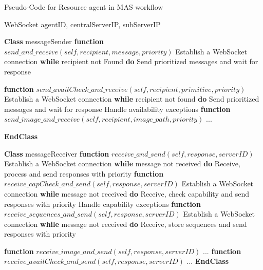 \begin{algorithm}
    \caption{Pseudo-Code for Resource agent in MAS workflow}
    \label{alg:RAPseudoCode}
    \begin{algorithmic}[1]
     WebSocket
     agentID, centralServerIP, subServerIP
    
\State \textbf{Class} messageSender
    \State \textbf{\qquad function} {$send\_and\_receive(self, recipient, message, priority)$}
    \State \qquad \qquad Establish a WebSocket connection    
    \State \textbf{\qquad \qquad while} recipient not Found \textbf{do}    
    \State \qquad \qquad \qquad Send prioritized messages and wait for response

    \State \textbf{\qquad function} {$send\_availCheck\_and\_receive(self, recipient, primitive, priority)$}
    \State \qquad \qquad Establish a WebSocket connection
    \State \textbf{\qquad \qquad while} recipient not found \textbf{do} 
    \State \qquad \qquad \qquad Send prioritized messages and wait for response
    \State \qquad \qquad \qquad Handle availability exceptions
    \State {}
    \State \textbf{\qquad function} {$send\_image\_and\_receive(self, recipient, image\_path, priority)$}
    \State \qquad \qquad ...

\State \textbf{EndClass}

\State \textbf{Class} messageReceiver
    \State \textbf{\qquad function} {$receive\_and\_send(self, response, serverID)$}
    \State \qquad \qquad Establish a WebSocket connection
    \State \textbf{\qquad \qquad while} message not received \textbf{do}
    \State \qquad \qquad \qquad Receive, process and send responses with priority
    \State \textbf{\qquad function} {$receive\_capCheck\_and\_send(self, response, serverID)$}
    \State \qquad \qquad Establish a WebSocket connection
    \State \textbf{\qquad \qquad while} message not received \textbf{do}
    \State \qquad \qquad \qquad Receive, check capability and send responses with priority
    \State \qquad \qquad \qquad Handle capability exceptions
    \State \textbf{\qquad function} {$receive\_sequences\_and\_send(self, response, serverID)$}
    \State \qquad \qquad Establish a WebSocket connection
    \State \textbf{\qquad \qquad while} message not received \textbf{do}
    \State \qquad \qquad \qquad Receive, store sequences and send responses with priority

    \State {}
    \State \textbf{\qquad function} {$receive\_image\_and\_send(self, response, serverID)$}
    \State \qquad \qquad ...    
    \State {}
    \State \textbf{\qquad function} {$receive\_availCheck\_and\_send(self, response, serverID)$}
    \State \qquad \qquad ...  
    \State \textbf{EndClass}
 
\end{algorithmic}
\end{algorithm}

